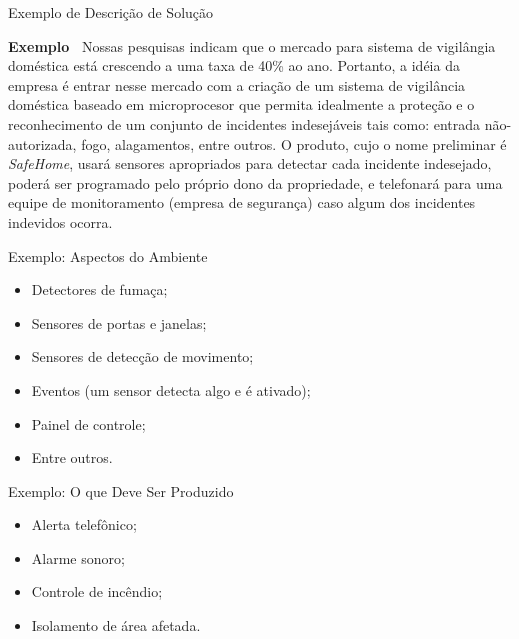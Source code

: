 \documentclass[xcolor=x11names,compress]{beamer}
\begin{document}
\begin{frame}{Exemplo de Descrição de Solução}

\begin{alertblock}{\textbf {Exemplo~\cite{Pressman-2001}}}
Nossas pesquisas indicam que o mercado para sistema de vigilângia doméstica está crescendo a uma taxa de 40\% ao ano. Portanto, a idéia da empresa é entrar nesse mercado com a criação de um sistema de vigilância doméstica baseado em microprocesor que permita idealmente a proteção e o reconhecimento de um conjunto de incidentes indesejáveis tais como: entrada não-autorizada, fogo, alagamentos, entre outros. O produto, cujo o nome preliminar é \textit{SafeHome}, usará sensores apropriados para detectar cada incidente indesejado, poderá ser programado pelo próprio dono da propriedade, e telefonará para uma equipe de monitoramento (empresa de segurança) caso algum dos incidentes indevidos ocorra.
\end{alertblock}
\end{frame}

\begin{frame}{Exemplo:  Aspectos do Ambiente}

\begin{itemize}
\itemsep 5mm

\item Detectores de fumaça;

\item Sensores de portas e janelas;

\item Sensores de detecção de movimento;

\item Eventos (um sensor detecta algo e é ativado);

\item Painel de controle;

\item Entre outros.

\end{itemize}

\end{frame}

\begin{frame}{Exemplo: O que Deve Ser Produzido}

\begin{itemize}
\itemsep 5mm

\item Alerta telefônico;

\item Alarme sonoro;

\item Controle de incêndio;

\item Isolamento de área afetada.

\end{itemize}

\end{frame}
\end{document}
